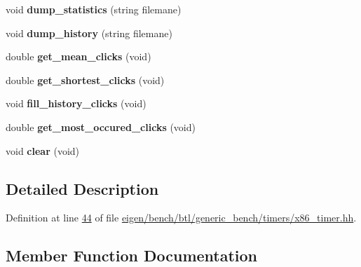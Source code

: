 \begin{DoxyCompactItemize}
void {\bfseries dump\+\_\+statistics} (string filemane)
\item 
\mbox{\label{class_x86___timer_a284acddc2cc02912231a29632457313a}} 
void {\bfseries dump\+\_\+history} (string filemane)
\item 
\mbox{\label{class_x86___timer_af538c36f392114bd1e6030280302a1ff}} 
double {\bfseries get\+\_\+mean\+\_\+clicks} (void)
\item 
\mbox{\label{class_x86___timer_a6631a74c2fe9fd5f58ddc2bf1d924c51}} 
double {\bfseries get\+\_\+shortest\+\_\+clicks} (void)
\item 
\mbox{\label{class_x86___timer_ae0bdf9ea9f1bd65b1e5d6fb4ad0c4e31}} 
void {\bfseries fill\+\_\+history\+\_\+clicks} (void)
\item 
\mbox{\label{class_x86___timer_aaf06db4cf233ad033b106bd6d68d3d10}} 
double {\bfseries get\+\_\+most\+\_\+occured\+\_\+clicks} (void)
\item 
\mbox{\label{class_x86___timer_ab5e6034aa0fdeee8f9073f24193d9ff5}} 
void {\bfseries clear} (void)
\end{DoxyCompactItemize}


\subsection{Detailed Description}


Definition at line \hyperlink{eigen_2bench_2btl_2generic__bench_2timers_2x86__timer_8hh_source_l00044}{44} of file \hyperlink{eigen_2bench_2btl_2generic__bench_2timers_2x86__timer_8hh_source}{eigen/bench/btl/generic\+\_\+bench/timers/x86\+\_\+timer.\+hh}.



\subsection{Member Function Documentation}
\mbox{\label{class_x86___timer_a1beddd8cb10ed89d3dd06d3b233b63e1}} 
